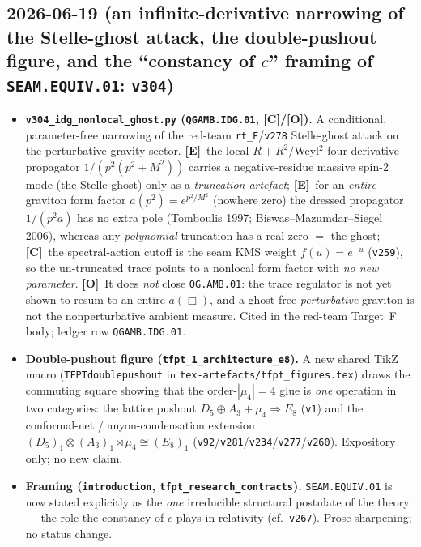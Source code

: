\documentclass[11pt]{article}
\providecommand{\mE}{\textbf{[E]}}\providecommand{\mC}{\textbf{[C]}}
\providecommand{\mO}{\textbf{[O]}}\providecommand{\mX}{\textbf{[X]}}
\providecommand{\vref}[1]{\texttt{#1}}
\begin{document}
\subsection*{2026-06-19 (an infinite-derivative narrowing of the Stelle-ghost attack, the double-pushout figure, and the ``constancy of $c$'' framing of \texttt{SEAM.EQUIV.01}: \texttt{v304})}
\begin{itemize}
\item \textbf{\texttt{v304\_idg\_nonlocal\_ghost.py} (\texttt{QGAMB.IDG.01}, \mC/\mO).} A conditional,
  parameter-free narrowing of the red-team \texttt{rt\_F}/\vref{v278} Stelle-ghost attack on the perturbative
  gravity sector. \mE\ the local $R{+}R^2/$Weyl$^2$ four-derivative propagator $1/(p^2(p^2{+}M^2))$ carries a
  negative-residue massive spin-2 mode (the Stelle ghost) only as a \emph{truncation artefact}; \mE\ for an
  \emph{entire} graviton form factor $a(p^2)=e^{p^2/M^2}$ (nowhere zero) the dressed propagator $1/(p^2a)$ has no
  extra pole (Tomboulis 1997; Biswas--Mazumdar--Siegel 2006), whereas any \emph{polynomial} truncation has a real
  zero $=$ the ghost; \mC\ the spectral-action cutoff is the seam KMS weight $f(u)=e^{-u}$ (\vref{v259}), so the
  un-truncated trace points to a nonlocal form factor with \emph{no new parameter}. \mO\ It does \emph{not} close
  \texttt{QG.AMB.01}: the trace regulator is not yet shown to resum to an entire $a(\Box)$, and a ghost-free
  \emph{perturbative} graviton is not the nonperturbative ambient measure. Cited in the red-team Target~F body;
  ledger row \texttt{QGAMB.IDG.01}.
\item \textbf{Double-pushout figure (\texttt{tfpt\_1\_architecture\_e8}).} A new shared TikZ macro
  (\texttt{TFPTdoublepushout} in \texttt{tex-artefacts/tfpt\_figures.tex}) draws the commuting square showing that
  the order-$|\mu_4|{=}4$ glue is \emph{one} operation in two categories: the lattice pushout
  $D_5\oplus A_3+\mu_4\Rightarrow E_8$ (\vref{v1}) and the conformal-net / anyon-condensation extension
  $(D_5)_1\otimes(A_3)_1\rtimes\mu_4\cong(E_8)_1$ (\vref{v92}/\vref{v281}/\vref{v234}/\vref{v277}/\vref{v260}).
  Expository only; no new claim.
\item \textbf{Framing (\texttt{introduction}, \texttt{tfpt\_research\_contracts}).} \texttt{SEAM.EQUIV.01} is now
  stated explicitly as the \emph{one} irreducible structural postulate of the theory --- the role the constancy of
  $c$ plays in relativity (cf.\ \vref{v267}). Prose sharpening; no status change.
\end{itemize}
\end{document}
